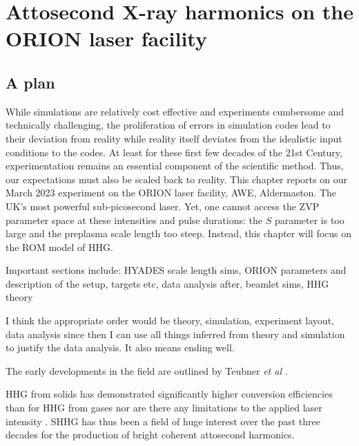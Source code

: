 \chapter{\label{ch:3-orion}Attosecond X-ray harmonics on the ORION laser facility} 

\minitoc

\section{A plan}

While simulations are relatively cost effective and experiments cumbersome and technically challenging, the proliferation of errors in simulation codes lead to their deviation from reality while reality itself deviates from the idealistic input conditions to the codes. At least for these first few decades of the 21st Century, experimentation remains an essential component of the scientific method. Thus, our expectations must also be scaled back to reality. This chapter reports on our March 2023 experiment on the ORION laser facility, AWE, Aldermaston. The UK's most powerful sub-picosecond laser. Yet, one cannot access the ZVP parameter space at these intensities and pulse durations: the $S$ parameter is too large and the preplasma scale length too steep. Instead, this chapter will focus on the ROM model of HHG.

Important sections include:
HYADES scale length sims, ORION parameters and description of the setup, targets etc, data analysis after, beamlet sims, HHG theory


I think the appropriate order would be theory, simulation, experiment layout, data analysis since then I can use all things inferred from theory and simulation to justify the data analysis. It also means ending well.

The early developments in the field are outlined by Teubner \textit{et al} \cite{teubnerHighorderHarmonicsLaserirradiated2009}.


HHG from solids has demonstrated significantly higher conversion efficiencies than for HHG from gases nor are there any limitations to the applied laser intensity \cite{teubnerHighorderHarmonicsLaserirradiated2009}. SHHG has thus been a field of huge interest over the past three decades for the production of bright coherent attosecond harmonics.



